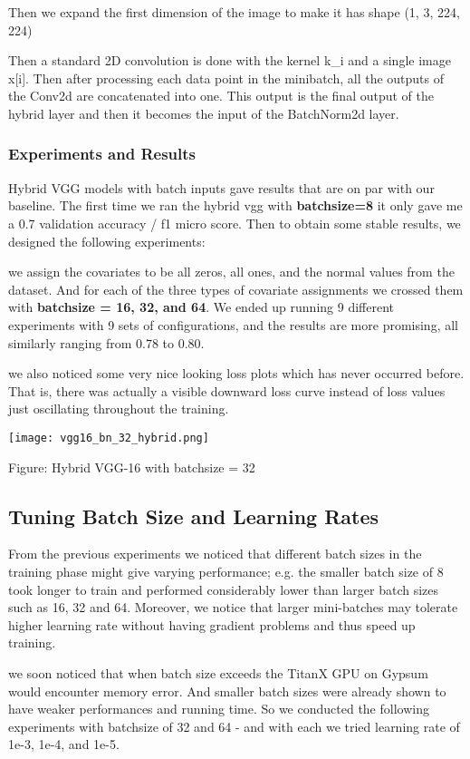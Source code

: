 \documentclass[12pt]{article}
\begin{document}
Then we expand the first dimension of the image to make it has shape (1, 3, 224, 224)

Then a standard 2D convolution is done with the kernel k\_i and a single image x[i]. Then after processing each data point in the minibatch, all the outputs of the Conv2d are concatenated into one. This output is the final output of the hybrid layer and then it becomes the input of the BatchNorm2d layer.

\subsubsection{Experiments and Results}
Hybrid VGG models with batch inputs gave results that are on par with our baseline. The first time we ran the hybrid vgg with \textbf{batchsize=8} it only gave me a 0.7 validation accuracy / f1 micro score. Then to obtain some stable results, we designed the following experiments:

we assign the covariates to be all zeros, all ones, and the normal values from the dataset. And for each of the three types of covariate assignments we crossed them with \textbf{batchsize = 16, 32, and 64}. We ended up running 9 different experiments with 9 sets of configurations, and the results are more promising, all similarly ranging from 0.78 to 0.80.

we also noticed some very nice looking loss plots which has never occurred before. That is, there was actually a visible downward loss curve instead of loss values just oscillating throughout the training.

\texttt{[image: vgg16\_bn\_32\_hybrid.png]}

Figure: Hybrid VGG-16 with batchsize = 32

\subsection{Tuning Batch Size and Learning Rates}
From the previous experiments we noticed that different batch sizes in the training phase might give varying performance; e.g.  the smaller batch size of 8 took longer to train and performed considerably lower than larger batch sizes such as 16, 32 and 64. Moreover, we notice that larger mini-batches may tolerate higher learning rate without having gradient problems and thus speed up training. 

we soon noticed that when batch size exceeds the TitanX GPU on Gypsum would encounter memory error. And smaller batch sizes were already shown to have weaker performances and running time. So we conducted the following experiments with batchsize of 32 and 64 - and with each we tried learning rate of 1e-3, 1e-4, and 1e-5. 
\end{document}
